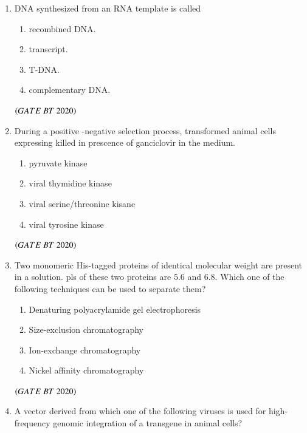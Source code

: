 \documentclass[journal,12pt,onecolumn]{IEEEtran}
\theoremstyle{remark}
\begin{document}
\begin{enumerate}[label=Q\arabic*:]
\item DNA synthesized from an RNA template is called
\begin{multicols}{2}
\begin{enumerate}
\item\;recombined DNA. 
\item\;transcript.
\item\;T-DNA.
\item\;complementary DNA.

\end{enumerate}
\end{multicols}
\hfill$\left(GATE\ BT\ 2020\right)$

\item During a positive -negative selection process, transformed animal cells expressing killed in prescence of ganciclovir in the medium.
\begin{multicols}{2}
\begin{enumerate}
\item\;pyruvate kinase
\item\;viral thymidine kinase
\item\;viral serine/threonine kisane  
\item\;viral tyrosine kinase

\end{enumerate}
\end{multicols}\hfill$\left(GATE\ BT\ 2020\right)$

\item Two monomeric His-tagged proteins of identical molecular weight are present in a solution. pls of these two proteins are $5.6$ and $6.8$. Which one of the following
techniques can be used to separate them?
\begin{multicols}{2}
\begin{enumerate}

\item\;Denaturing polyacrylamide gel electrophoresis 
\item\;Size-exclusion chromatography
\item\;Ion-exchange chromatography
\item\;Nickel affinity chromatography

\end{enumerate}
\end{multicols}\hfill$\left(GATE\ BT\ 2020\right)$

\item A vector derived from which one of the following viruses is used for high-
frequency genomic integration of a transgene in animal cells?
\begin{multicols}{2}
\begin{enumerate}


\end{enumerate}
\end{multicols}
\end{enumerate}
\end{document}

